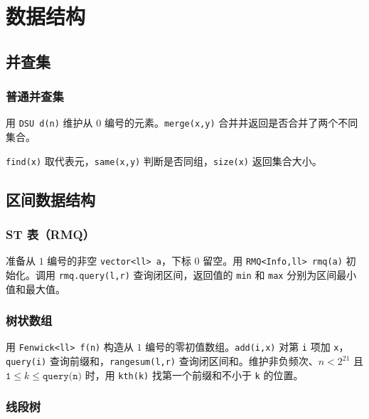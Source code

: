\chapter{数据结构}

\section{并查集}

\subsection{普通并查集}

用 \texttt{DSU d(n)} 维护从 $0$ 编号的元素。\texttt{merge(x,y)} 合并并返回是否合并了两个不同集合。

\texttt{find(x)} 取代表元，\texttt{same(x,y)} 判断是否同组，\texttt{size(x)} 返回集合大小。


\section{区间数据结构}

\subsection{ST 表（RMQ）}

准备从 $1$ 编号的非空 \texttt{vector<ll> a}，下标 $0$ 留空。用 \texttt{RMQ<Info,ll> rmq(a)} 初始化。调用 \texttt{rmq.query(l,r)} 查询闭区间，返回值的 \texttt{min} 和 \texttt{max} 分别为区间最小值和最大值。


\subsection{树状数组}

用 \texttt{Fenwick<ll> f(n)} 构造从 $1$ 编号的零初值数组。\texttt{add(i,x)} 对第 \texttt{i} 项加 \texttt{x}，\texttt{query(i)} 查询前缀和，\texttt{rangesum(l,r)} 查询闭区间和。维护非负频次、$n<2^{21}$ 且 $\texttt{1}\le k\le\texttt{query(n)}$ 时，用 \texttt{kth(k)} 找第一个前缀和不小于 \texttt{k} 的位置。


\subsection{线段树}

